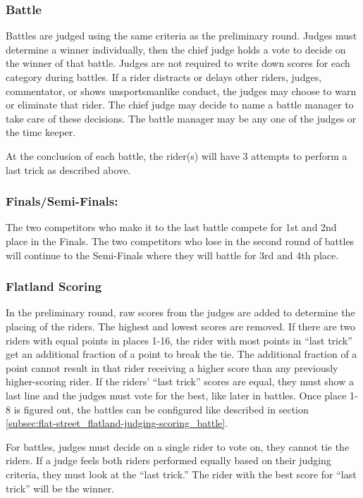 \subsubsection{Battle \label{subsec:flat-street_flatland-judging-scoring_battle}}
Battles are judged using the same criteria as the preliminary round.
Judges must determine a winner individually, then the chief judge holds a vote to decide on the winner of that battle.
Judges are not required to write down scores for each category during battles.
If a rider distracts or delays other riders, judges, commentator, or shows unsportsmanlike conduct, the judges may choose to warn or eliminate that rider.
The chief judge may decide to name a battle manager to take care of these decisions.
The battle manager may be any one of the judges or the time keeper.

At the conclusion of each battle, the rider(s) will have 3 attempts to perform a last trick as described above.

\subsubsection{Finals/Semi-Finals:}
The two competitors who make it to the last battle compete for 1st and 2nd place in the Finals.
The two competitors who lose in the second round of battles will continue to the Semi-Finals where they will battle for 3rd and 4th place.

\subsubsection{Flatland Scoring}
In the preliminary round, raw scores from the judges are added to determine the placing of the riders.
The highest and lowest scores are removed.
If there are two riders with equal points in places 1-16, the rider with most points in ``last trick'' get an additional fraction of a point to break the tie.
The additional fraction of a point cannot result in that rider receiving a higher score than any previously higher-scoring rider.
If the riders' ``last trick'' scores are equal, they must show a last line and the judges must vote for the best, like later in battles.
Once place 1-8 is figured out, the battles can be configured like described in section \ref{subsec:flat-street_flatland-judging-scoring_battle}.

For battles, judges must decide on a single rider to vote on, they cannot tie the riders.
If a judge feels both riders performed equally based on their judging criteria, they must look at the ``last trick.''
The rider with the best score for ``last trick'' will be the winner.
